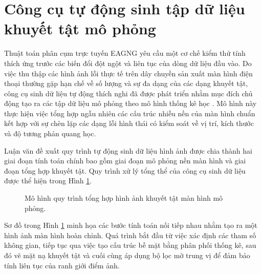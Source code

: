 \section{Công cụ tự động sinh tập dữ liệu khuyết tật mô phỏng}

Thuật toán phân cụm trực tuyến EAGNG yêu cầu một cơ chế kiểm thử tính thích ứng trước các biến đổi đột ngột và liên tục của dòng dữ liệu đầu vào. Do việc thu thập các hình ảnh lỗi thực tế trên dây chuyền sản xuất màn hình điện thoại thường gặp hạn chế về số lượng và sự đa dạng của các dạng khuyết tật, công cụ sinh dữ liệu tự động thích nghi đã được phát triển nhằm mục đích chủ động tạo ra các tập dữ liệu mô phỏng theo mô hình thống kê học \cite{gonzalez2018digital}. Mô hình này thực hiện việc tổng hợp ngẫu nhiên các cấu trúc nhiễu nền của màn hình chuẩn kết hợp với sự chèn lặp các dạng lỗi hình thái có kiểm soát về vị trí, kích thước và độ tương phản quang học.

Luận văn đề xuất quy trình tự động sinh dữ liệu hình ảnh được chia thành hai giai đoạn tính toán chính bao gồm giai đoạn mô phỏng nền màn hình và giai đoạn tổng hợp khuyết tật. Quy trình xử lý tổng thể của công cụ sinh dữ liệu được thể hiện trong Hình \ref{fig:generator_workflow}.

\begin{figure}[htbp]
\centering
{}
\caption{Mô hình quy trình tổng hợp hình ảnh khuyết tật màn hình mô phỏng.}
\label{fig:generator_workflow}
\end{figure}

Sơ đồ trong Hình \ref{fig:generator_workflow} minh họa các bước tính toán nối tiếp nhau nhằm tạo ra một hình ảnh màn hình hoàn chỉnh. Quá trình bắt đầu từ việc xác định các tham số không gian, tiếp tục qua việc tạo cấu trúc bề mặt bằng phân phối thống kê, sau đó vẽ mặt nạ khuyết tật và cuối cùng áp dụng bộ lọc mờ trung vị để đảm bảo tính liên tục của ranh giới điểm ảnh.

